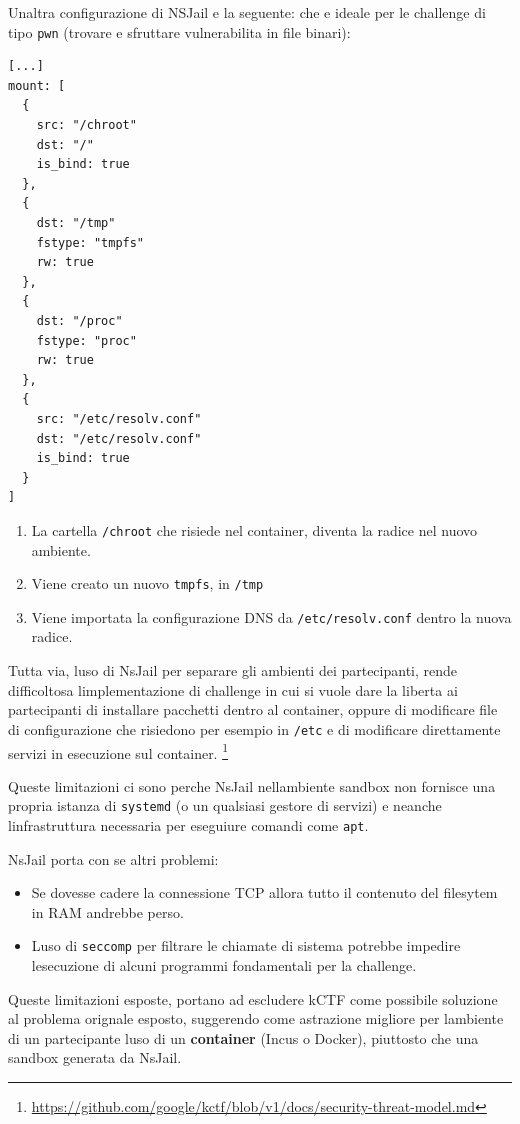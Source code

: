 Un\textquotesingle altra configurazione di NSJail e\textquotesingle{} la
seguente: che e\textquotesingle{} ideale per le challenge di tipo
\passthrough{\lstinline!pwn!} (trovare e sfruttare vulnerabilita in file
binari):

\begin{lstlisting}
[...]
mount: [
  {
    src: "/chroot"
    dst: "/"
    is_bind: true
  },
  {
    dst: "/tmp"
    fstype: "tmpfs"
    rw: true
  },
  {
    dst: "/proc"
    fstype: "proc"
    rw: true
  },
  {
    src: "/etc/resolv.conf"
    dst: "/etc/resolv.conf"
    is_bind: true
  }
]
\end{lstlisting}

\begin{enumerate}
\def\labelenumi{\arabic{enumi}.}
\tightlist
\item
  La cartella \passthrough{\lstinline!/chroot!} che risiede nel
  container, diventa la radice nel nuovo ambiente.
\item
  Viene creato un nuovo \passthrough{\lstinline!tmpfs!}, in
  \passthrough{\lstinline!/tmp!}
\item
  Viene importata la configurazione DNS da
  \passthrough{\lstinline!/etc/resolv.conf!} dentro la nuova radice.
\end{enumerate}

Tutta via, l\textquotesingle uso di NsJail per separare gli ambienti dei
partecipanti, rende difficoltosa l\textquotesingle implementazione di
challenge in cui si vuole dare la liberta ai partecipanti di installare
pacchetti dentro al container, oppure di modificare file di
configurazione che risiedono per esempio in
\passthrough{\lstinline!/etc!} e di modificare direttamente servizi in
esecuzione sul container. \footnote{\label{fn:ref_8}\url{https://github.com/google/kctf/blob/v1/docs/security-threat-model.md}}

Queste limitazioni ci sono perche NsJail nell\textquotesingle ambiente
sandbox non fornisce una propria istanza di
\passthrough{\lstinline!systemd!} (o un qualsiasi gestore di servizi) e
neanche l\textquotesingle infrastruttura necessaria per eseguiure
comandi come \passthrough{\lstinline!apt!}.

NsJail porta con se altri problemi:

\begin{itemize}
\tightlist
\item
  Se dovesse cadere la connessione TCP allora tutto il contenuto del
  filesytem in RAM andrebbe perso.
\item
  L\textquotesingle uso di \passthrough{\lstinline!seccomp!} per
  filtrare le chiamate di sistema potrebbe impedire
  l\textquotesingle esecuzione di alcuni programmi fondamentali per la
  challenge.
\end{itemize}

Queste limitazioni esposte, portano ad escludere kCTF come possibile
soluzione al problema orignale esposto, suggerendo come astrazione
migliore per l\textquotesingle ambiente di un partecipante
l\textquotesingle uso di un \textbf{container} (Incus o Docker),
piuttosto che una sandbox generata da NsJail.
